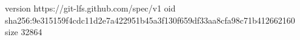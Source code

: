 version https://git-lfs.github.com/spec/v1
oid sha256:9e315159f4cdc11d2e7a422951b45a3f130f659df33aa8cfa98c71b412662160
size 32864
